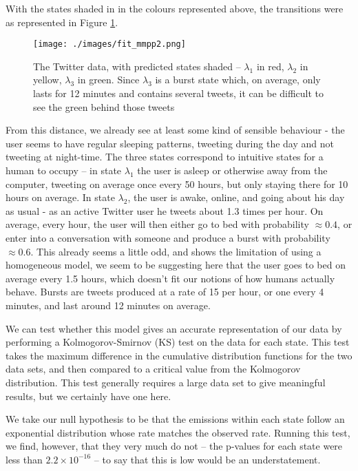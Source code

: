 With the states shaded in in the colours represented above, the transitions were as represented in Figure \ref{fit_mmpp2}.
\begin{figure}[h!]
\centering
\texttt{[image: ./images/fit\_mmpp2.png]}
\caption{The Twitter data, with predicted states shaded -- $\lambda_1$ in red, $\lambda_2$ in yellow, $\lambda_3$ in green. Since $\lambda_3$ is a burst state which, on average, only lasts for 12 minutes and contains several tweets, it can be difficult to see the green behind those tweets}
\label{fit_mmpp2}
\end{figure}
From this distance, we already see at least some kind of sensible behaviour - the user seems to have regular sleeping patterns, tweeting during the day and not tweeting at night-time. The three states correspond to intuitive states for a human to occupy -- in state $\lambda_1$ the user is asleep or otherwise away from the computer, tweeting on average once every 50 hours, but only staying there for 10 hours on average. In state $\lambda_2$, the user is awake, online, and going about his day as usual - as an active Twitter user he tweets about 1.3 times per hour. On average, every hour, the user will then either go to bed with probability $\approx 0.4$, or enter into a conversation with someone and produce a burst with probability $\approx 0.6$. This already seems a little odd, and shows the limitation of using a homogeneous model, we seem to be suggesting here that the user goes to bed on average every 1.5 hours, which doesn't fit our notions of how humans actually behave. Bursts are tweets produced at a rate of 15 per hour, or one every 4 minutes, and last around 12 minutes on average.

We can test whether this model gives an accurate representation of our data by performing a Kolmogorov-Smirnov (KS) \cite{mwkstest} test on the data for each state. This test takes the maximum difference in the cumulative distribution functions for the two data sets, and then compared to a critical value from the Kolmogorov distribution. This test generally requires a large data set to give meaningful results, but we certainly have one here. 

We take our null hypothesis to be that the emissions within each state follow an exponential distribution whose rate matches the observed rate. Running this test, we find, however, that they very much do not -- the p-values for each state were less than $2.2 \times 10^{-16}$ -- to say that this is low would be an understatement.

